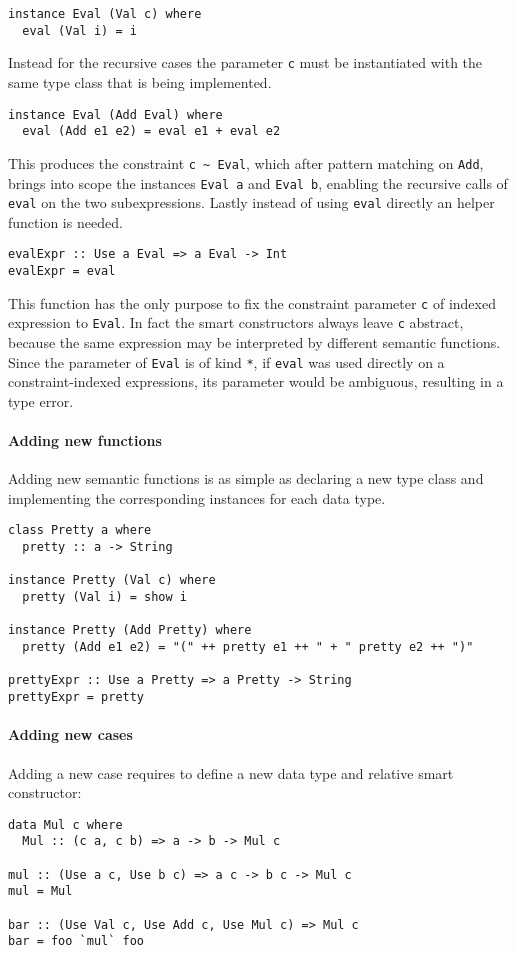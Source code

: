 \documentclass[../Thesis.tex]{subfiles}
\begin{document}
\begin{verbatim}
instance Eval (Val c) where
  eval (Val i) = i
\end{verbatim}

Instead for the recursive cases the parameter \texttt{c} must be instantiated with the same type class that is being implemented. 

\begin{verbatim}  
instance Eval (Add Eval) where
  eval (Add e1 e2) = eval e1 + eval e2
  \end{verbatim}

This produces the constraint \texttt{c \textasciitilde\ Eval}, 
which after pattern matching on \texttt{Add}, brings into scope 
the instances \texttt{Eval a} and \texttt{Eval b}, enabling the 
recursive calls of \texttt{eval} on the two subexpressions.
Lastly instead of using \texttt{eval} directly an helper function is needed.

\begin{verbatim}
evalExpr :: Use a Eval => a Eval -> Int
evalExpr = eval
\end{verbatim}

This function has the only purpose to fix the constraint parameter \texttt{c} 
of indexed expression to \texttt{Eval}.
In fact the smart constructors always leave \texttt{c} abstract, because the same expression may be interpreted by different semantic functions.
Since the parameter of \texttt{Eval} is of kind \texttt{*}, if \texttt{eval}
was used directly on a constraint-indexed expressions, its parameter
would be ambiguous, resulting in a type error.

\paragraph{Adding new functions}
Adding new semantic functions is as simple as declaring a new type class and 
implementing the corresponding instances for each data type.
\begin{verbatim}
class Pretty a where
  pretty :: a -> String

instance Pretty (Val c) where
  pretty (Val i) = show i  

instance Pretty (Add Pretty) where
  pretty (Add e1 e2) = "(" ++ pretty e1 ++ " + " pretty e2 ++ ")"

prettyExpr :: Use a Pretty => a Pretty -> String
prettyExpr = pretty
\end{verbatim}

\paragraph{Adding new cases}
Adding a new case requires to define a new data type and relative
smart constructor:
\begin{verbatim}
data Mul c where
  Mul :: (c a, c b) => a -> b -> Mul c

mul :: (Use a c, Use b c) => a c -> b c -> Mul c
mul = Mul

bar :: (Use Val c, Use Add c, Use Mul c) => Mul c
bar = foo `mul` foo
\end{verbatim}
\end{document}
